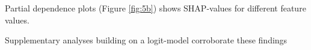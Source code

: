 \documentclass[12pt, a4paper]{article}
\newenvironment{subcaption2}
{\strut
\vspace{-5pt}
\begin{minipage}[b]{0.9\textwidth}
  \hspace*{-\parindent}
  \footnotesize}
 {\end{minipage}}
\begin{document}
Partial dependence plots (Figure \ref{fig:5b}) shows SHAP-values for different feature values. 

Supplementary analyses building on a logit-model corroborate these findings



\end{document}
